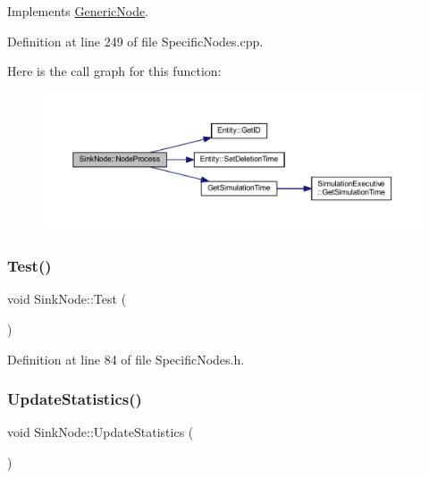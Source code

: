 Implements \hyperlink{class_generic_node_ae942258a57f211072d179da470579add}{Generic\+Node}.



Definition at line 249 of file Specific\+Nodes.\+cpp.

Here is the call graph for this function\+:
\nopagebreak
\begin{figure}[H]
\begin{center}
\leavevmode
\includegraphics[width=350pt]{class_sink_node_a5f3fe2c195c3bb154f27bdf3ae27dd27_cgraph}
\end{center}
\end{figure}
\mbox{\label{class_sink_node_adffbd13ea7f32f79b585b7a8955d1d45}} 
\subsubsection{\texorpdfstring{Test()}{Test()}}
{\footnotesize\ttfamily void Sink\+Node\+::\+Test (\begin{DoxyParamCaption}{ }\end{DoxyParamCaption})\hspace{0.3cm}{\ttfamily [inline]}}



Definition at line 84 of file Specific\+Nodes.\+h.

\mbox{\label{class_sink_node_adf5f0001fd1d3d61725ff6a6f5b40ba7}} 
\subsubsection{\texorpdfstring{Update\+Statistics()}{UpdateStatistics()}}
{\footnotesize\ttfamily void Sink\+Node\+::\+Update\+Statistics (\begin{DoxyParamCaption}{ }\end{DoxyParamCaption})}



